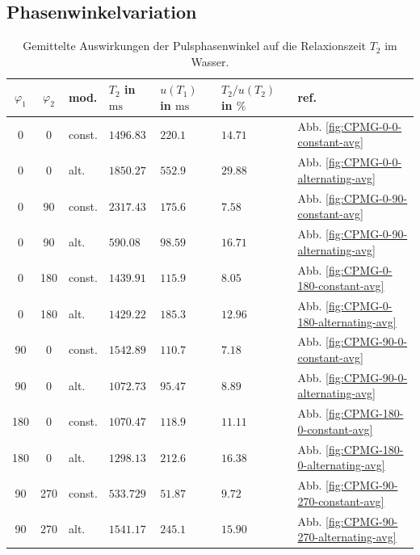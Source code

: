 \documentclass{article}
\begin{document}
    \subsection*{Phasenwinkelvariation}

        \begin{table}[H]
            \centering
            \begin{tabular}{c|c|l|lll|l}
                $\varphi_1$ & $\varphi_2$ & mod. & $T_2$ in $\si{\ms}$ & $u(T_1)$ in $\si{\ms}$ & $T_2/u(T_2)$ in $\si{\percent}$ & ref. \\
                \hline\hline
                0 & 0 & const. & $1496.83$ & $220.1$ & $14.71$ & Abb. \ref{fig:CPMG-0-0-constant-avg} \\
                0 & 0 & alt. & $1850.27$ & $552.9$ & $29.88$ & Abb. \ref{fig:CPMG-0-0-alternating-avg} \\
                \hline
                0 & 90 & const. & $2317.43$ & $175.6$ & $7.58$ & Abb. \ref{fig:CPMG-0-90-constant-avg} \\
                0 & 90 & alt. & $590.08$ & $98.59$ & $16.71$ & Abb. \ref{fig:CPMG-0-90-alternating-avg} \\
                \hline
                0 & 180 & const. & $1439.91$ & $115.9$ & $8.05$ & Abb. \ref{fig:CPMG-0-180-constant-avg} \\
                0 & 180 & alt. & $1429.22$ & $185.3$ & $12.96$ & Abb. \ref{fig:CPMG-0-180-alternating-avg} \\
                \hline
                90 & 0 & const. & $1542.89$ & $110.7$ & $7.18$ & Abb. \ref{fig:CPMG-90-0-constant-avg} \\
                90 & 0 & alt. & $1072.73$ & $95.47$ & $8.89$ & Abb. \ref{fig:CPMG-90-0-alternating-avg} \\
                \hline
                180 & 0 & const. & $1070.47$ & $118.9$ & $11.11$ & Abb. \ref{fig:CPMG-180-0-constant-avg} \\
                180 & 0 & alt. & $1298.13$ & $212.6$ & $16.38$ & Abb. \ref{fig:CPMG-180-0-alternating-avg} \\
                \hline
                90 & 270 & const. & $533.729$ & $51.87$ & $9.72$ & Abb. \ref{fig:CPMG-90-270-constant-avg} \\
                90 & 270 & alt. & $1541.17$ & $245.1$ & $15.90$ & Abb. \ref{fig:CPMG-90-270-alternating-avg} \\
            \end{tabular}
            \caption{Gemittelte Auswirkungen der Pulsphasenwinkel auf die Relaxionszeit $T_2$ im Wasser.}
        \end{table}
\end{document}
